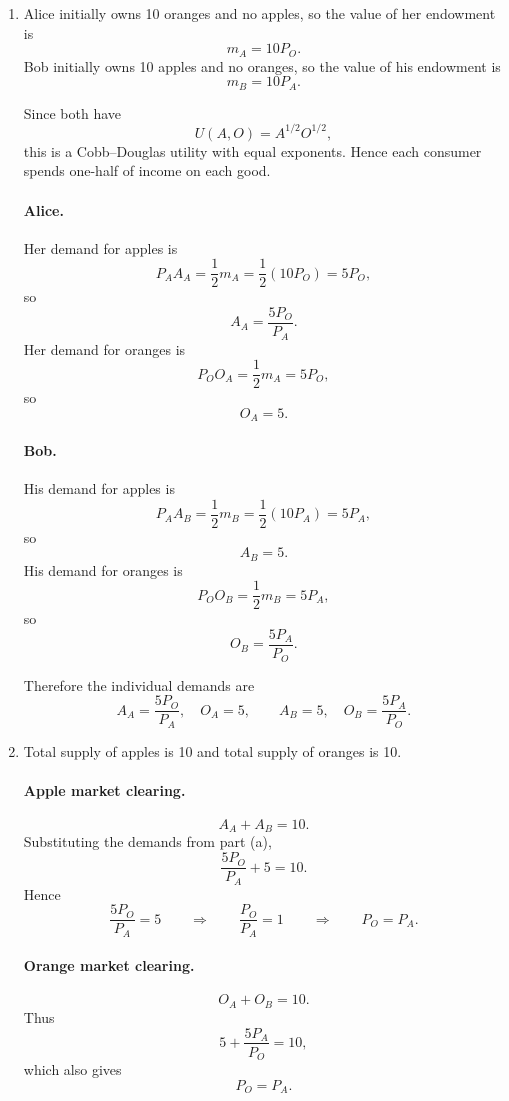 \documentclass[12pt]{article}
\begin{document}
\begin{enumerate}[label=(\alph*)]
    \item
    Alice initially owns 10 oranges and no apples, so the value of her endowment is
    \[
    m_A = 10P_O.
    \]
    Bob initially owns 10 apples and no oranges, so the value of his endowment is
    \[
    m_B = 10P_A.
    \]

    Since both have
    \[
    U(A,O)=A^{1/2}O^{1/2},
    \]
    this is a Cobb--Douglas utility with equal exponents. Hence each consumer spends one-half of income on each good.

    \paragraph{Alice.}
    Her demand for apples is
    \[
    P_A A_A = \frac12 m_A = \frac12 (10P_O)=5P_O,
    \]
    so
    \[
    A_A=\frac{5P_O}{P_A}.
    \]
    Her demand for oranges is
    \[
    P_O O_A = \frac12 m_A = 5P_O,
    \]
    so
    \[
    O_A=5.
    \]

    \paragraph{Bob.}
    His demand for apples is
    \[
    P_A A_B = \frac12 m_B = \frac12 (10P_A)=5P_A,
    \]
    so
    \[
    A_B=5.
    \]
    His demand for oranges is
    \[
    P_O O_B = \frac12 m_B = 5P_A,
    \]
    so
    \[
    O_B=\frac{5P_A}{P_O}.
    \]

    Therefore the individual demands are
    \[
    \boxed{
    A_A=\frac{5P_O}{P_A},\quad O_A=5,\qquad A_B=5,\quad O_B=\frac{5P_A}{P_O}.}
    \]

    \item
    Total supply of apples is 10 and total supply of oranges is 10.

    \paragraph{Apple market clearing.}
    \[
    A_A+A_B=10.
    \]
    Substituting the demands from part (a),
    \[
    \frac{5P_O}{P_A}+5=10.
    \]
    Hence
    \[
    \frac{5P_O}{P_A}=5
    \qquad\Longrightarrow\qquad
    \frac{P_O}{P_A}=1
    \qquad\Longrightarrow\qquad
    \boxed{P_O=P_A.}
    \]

    \paragraph{Orange market clearing.}
    \[
    O_A+O_B=10.
    \]
    Thus
    \[
    5+\frac{5P_A}{P_O}=10,
    \]
    which also gives
    \[
    \boxed{P_O=P_A.}
    \]


\end{enumerate}
\end{document}
